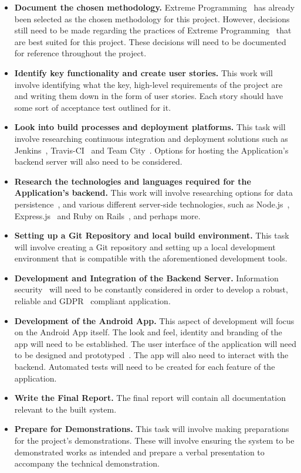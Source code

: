 \documentclass[11pt,fleqn,twoside]{article}
\begin{document}
\begin{itemize}
	\item \textbf{Document the chosen methodology.} Extreme Programming~\cite{xp_applied_ref, xp_explained_ref} has already been selected as the chosen methodology for this project. However, decisions still need to be made regarding the practices of Extreme Programming~\cite{xp_applied_ref, xp_explained_ref} that are best suited for this project. These decisions will need to be documented for reference throughout the project.
	\item \textbf{Identify key functionality and create user stories.} This work will involve identifying what the key, high-level requirements of the project are and writing them down in the form of user stories. Each story should have some sort of acceptance test outlined for it.
	\item \textbf{Look into build processes and deployment platforms.} This task will involve researching continuous integration and deployment solutions such as Jenkins~\cite{jenkins_documentation_ref}, Travis-CI~\cite{travis_documentation_ref} and Team City~\cite{teamcity_documentation_ref}. Options for hosting the Application's backend server will also need to be considered.
	\item \textbf{Research the technologies and languages required for the Application's backend.} This work will involve researching options for data persistence~\cite{mongodb_documentation_ref}, and various different server-side technologies, such as Node.js~\cite{nodejs_documentation_ref}, Express.js~\cite{expressjs_documentation_ref} and Ruby on Rails~\cite{rails_documentation_ref}, and perhaps more.
	\item \textbf{Setting up a Git Repository and local build environment.} This task will involve creating a Git repository and setting up a local development environment that is compatible with the aforementioned development tools.
	\item \textbf{Development and Integration of the Backend Server.} Information security~\cite{nodejs_security_ref} will need to be constantly considered in order to develop a robust, reliable and GDPR~\cite{gdpr_legislation_ref} compliant application.
	\item \textbf{Development of the Android App.} This aspect of development will focus on the Android App itself. The look and feel, identity and branding of the app will need to be established. The user interface of the application will need to be designed and prototyped~\cite{adobeXD_documentation_ref, fluidUI_documentation_ref}. The app will also need to interact with the backend. Automated tests will need to be created for each feature of the application.
	\item \textbf{Write the Final Report.} The final report will contain all documentation relevant to the built system.
	\item \textbf{Prepare for Demonstrations.} This task will involve making preparations for the project's demonstrations. These will involve ensuring the system to be demonstrated works as intended and prepare a verbal presentation to accompany the technical demonstration.
\end{itemize}
\end{document}
